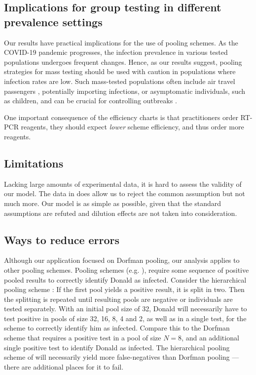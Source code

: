 \documentclass{article}
\begin{document}
\subsection{Implications for group testing in different prevalence settings}
Our results have practical implications for the use of pooling
schemes. As the COVID-19 pandemic progresses, the infection prevalence
in various tested populations undergoes frequent changes. Hence, as
our results suggest, pooling strategies for mass testing should be
used with caution in populations where infection rates are low. Such
mass-tested populations often include air travel passengers
\cite{JTM,RobinHood}, potentially importing infections, or
asymptomatic individuals, such as children, and can be crucial for
controlling outbreaks \cite{MinaScience}.

One important consequence of the efficiency charts is that
practitioners order RT-PCR reagents, they should expect \emph{lower}
scheme efficiency, and thus order more reagents.

\subsection{Limitations}
Lacking large amounts of experimental data, it is hard to assess the
validity of our model. The data in \cite{Salazar} does allow us to
reject the common assumption but not much more. Our model is as simple
as possible, given that the standard assumptions are refuted and
dilution effects are not taken into consideration.

\subsection{Ways to reduce errors}
Although our application focused on Dorfman pooling, our analysis
applies to other pooling schemes. Pooling schemes
(e.g. \cite{MatrixPooling,Lion, Kim}), require some sequence of
positive pooled results to correctly identify Donald as
infected. Consider the hierarchical pooling scheme \cite{Lion, Kim}:
If the first pool yields a positive result, it is split in two. Then
the splitting is repeated until resulting pools are negative or
individuals are tested separately. With an initial pool size of 32,
Donald will necessarily have to test positive in pools of size 32, 16,
8, 4 and 2, as well as in a single test, for the scheme to correctly
identify him as infected. Compare this to the Dorfman scheme that
requires a positive test in a pool of size $N=8$, and an additional
single positive test to identify Donald as infected. The hierarchical
pooling scheme of \cite{Lion, Kim} will necessarily yield more
false-negatives than Dorfman pooling --- there are additional places
for it to fail.
\end{document}
